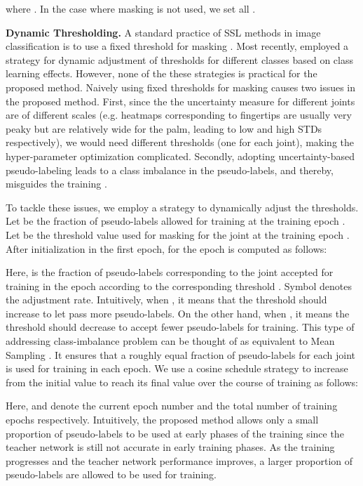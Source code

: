 \documentclass{article}
\begin{document}
where . In the case where masking is not used, we set all .
\par

\textbf{Dynamic Thresholding.} A standard practice of SSL methods in image classification is to use a fixed threshold for masking \cite{sohn2020fixmatch,xie2019unsupervised}. Most recently, \cite{zhang2021flexmatch} employed a strategy for dynamic adjustment of thresholds for different classes based on class learning effects. However, none of the these strategies is practical for the proposed method. Naively using fixed thresholds for masking causes two issues in the proposed method. First, since the the uncertainty measure for different joints are of different scales (e.g. heatmaps corresponding to fingertips are usually very peaky but are relatively wide for the palm, leading to low and high STDs respectively), we would need  different thresholds (one for each joint), making the hyper-parameter optimization complicated. Secondly, adopting uncertainty-based pseudo-labeling leads to a class imbalance in the pseudo-labels, and thereby, misguides the training \cite{nassar2021all}. \par
To tackle these issues, we employ a strategy to dynamically adjust the thresholds. Let  be the fraction of pseudo-labels allowed for training at the training epoch . Let  be the threshold value used for masking for the  joint at the training epoch . After initialization in the first epoch,   for the epoch  is computed as follows:

Here,  is the fraction of pseudo-labels corresponding to the  joint accepted for training in the epoch  according to the corresponding threshold . Symbol  denotes the adjustment rate. Intuitively, when , it means that the threshold  should increase to let pass more pseudo-labels. On the other hand, when , it means the threshold  should decrease to accept fewer pseudo-labels for training. This type of addressing class-imbalance problem can be thought of as equivalent to Mean Sampling \cite{he2021rethinking}. It ensures that a roughly equal fraction  of pseudo-labels for each joint is used for training in each epoch. We use a cosine schedule strategy \cite{loshchilov2016sgdr} to increase   from the initial value  to reach  its final value  over the course of training as follows:

Here,  and  denote the current epoch number and the total number of training epochs respectively. Intuitively, the proposed method allows only a small proportion of pseudo-labels to be used at early phases of the training since the teacher network is still not accurate in early training phases. As the training progresses and the teacher network performance improves, a larger proportion of pseudo-labels are allowed to be used for training. 
\par
\end{document}
